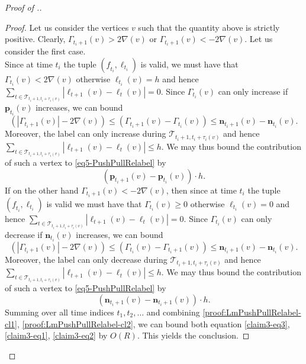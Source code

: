\documentclass[11pt]{article}
\newcommand\bell{\boldsymbol{\mathit{\ell}}}
\newcommand\ff{\boldsymbol{\mathit{f}}}
\begin{document}
\begin{proof}[Proof of .]
\begin{proof}
    Let us consider the vertices $v$ such that the quantity above is strictly positive. Clearly, $\Gamma_{t_i+1}(v) > 2\nabla(v)$ or $\Gamma_{t_i+1}(v) < -2\nabla(v)$. Let us consider the first case.\\ Since at time $t_i$ the tuple $(\ff_{t_i},\bell_{t_i})$ is valid, we must have that $\Gamma_{t_i}(v) < 2\nabla(v)$ otherwise $\bell_{t_i}(v) = h$ and hence $\sum_{t \in \mathcal{T}_{t_i + 1,t_{i}  + \tau_i(v)}} |\bell_{t+1}(v) - \bell_t(v)| = 0$. 
    Since $\Gamma_{t_i}(v)$ can only increase if $\textbf{p}_{t_i}(v)$ increases, we can bound 
    \[\left(|\Gamma_{t_i + 1}(v)| - 2\nabla(v)\right) \leq \left( \Gamma_{t_{i}+1}(v) - \Gamma_{t_i}(v) \right) \leq \textbf{n}_{t_i+1}(v) - \textbf{n}_{t_i}(v). \]
    Moreover, the label can only increase during $\mathcal{T}_{t_i + 1, t_i + \tau_i(v)}$ and hence $\sum_{t \in \mathcal{T}_{t_i + 1,t_{i}  + \tau_i(v)}} |\bell_{t+1}(v) - \bell_t(v)| \leq h$. We may thus bound the contribution of such a vertex to \eqref{eq5-PushPullRelabel} by
    \begin{equation}\label{claim3-eq1}
        \left(\textbf{p}_{t_i + 1}(v) - \textbf{p}_{t_i}(v)\right) \cdot h.
    \end{equation}
    If on the other hand $\Gamma_{t_i+1}(v) < -2\nabla(v)$, then since at time $t_i$ the tuple $(\ff_{t_i},\bell_{t_i})$ is valid we must have that $\Gamma_{t_i}(v) \geq 0$ otherwise $\bell_{t_i}(v) = 0$ and hence $\sum_{t \in \mathcal{T}_{t_i + 1,t_{i}  + \tau_i(v)}} |\bell_{t+1}(v) - \bell_t(v)| = 0$. Since $\Gamma_{t_i}(v)$ can only decrease if $\textbf{n}_{t_i}(v)$ increases, we can bound 
    \[\left(|\Gamma_{t_i + 1}(v)| - 2\nabla(v)\right) \leq \left( \Gamma_{t_i}(v) - \Gamma_{t_i + 1}(v) \right) \leq \textbf{n}_{t_i+1}(v) - \textbf{n}_{t_i}(v). \]
    Moreover, the label can only decrease during $\mathcal{T}_{t_i + 1, t_i + \tau_i(v)}$ and hence $\sum_{t \in \mathcal{T}_{t_i + 1,t_{i}  + \tau_i(v)}} |\bell_{t+1}(v) - \bell_t(v)| \leq h$. We may thus bound the contribution of such a vertex to \eqref{eq5-PushPullRelabel} by
    \begin{equation}\label{claim3-eq2}
        \left(\textbf{n}_{t_i + 1}(v) - \textbf{n}_{t_i + 1}(v)\right) \cdot h.
    \end{equation}
    Summing over all time indices $t_1, t_2, \dots$ and combining \cref{proof:LmPushPullRelabel-cl1}, \cref{proof:LmPushPullRelabel-cl2}, we can bound both equation \ref{claim3-eq3}, \ref{claim3-eq1}, \ref{claim3-eq2} by $O(R)$. This yields the conclusion. 
    \end{proof}
\end{proof}
\end{document}
